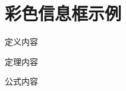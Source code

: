 \section{彩色信息框示例}

\begin{dy}
    定义内容
\end{dy}

\begin{dl}
    定理内容
\end{dl}

\begin{gs}
    公式内容
\end{gs}

\newpage